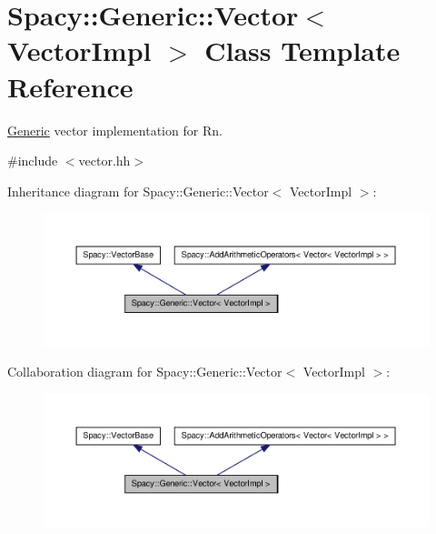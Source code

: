 \hypertarget{classSpacy_1_1Generic_1_1Vector}{\section{\-Spacy\-:\-:\-Generic\-:\-:\-Vector$<$ \-Vector\-Impl $>$ \-Class \-Template \-Reference}
\label{classSpacy_1_1Generic_1_1Vector}
}


\hyperlink{namespaceSpacy_1_1Generic}{\-Generic} vector implementation for \-Rn.  




{\ttfamily \#include $<$vector.\-hh$>$}



\-Inheritance diagram for \-Spacy\-:\-:\-Generic\-:\-:\-Vector$<$ \-Vector\-Impl $>$\-:
\nopagebreak
\begin{figure}[H]
\begin{center}
\leavevmode
\includegraphics[width=350pt]{classSpacy_1_1Generic_1_1Vector__inherit__graph}
\end{center}
\end{figure}


\-Collaboration diagram for \-Spacy\-:\-:\-Generic\-:\-:\-Vector$<$ \-Vector\-Impl $>$\-:
\nopagebreak
\begin{figure}[H]
\begin{center}
\leavevmode
\includegraphics[width=350pt]{classSpacy_1_1Generic_1_1Vector__coll__graph}
\end{center}
\end{figure}
